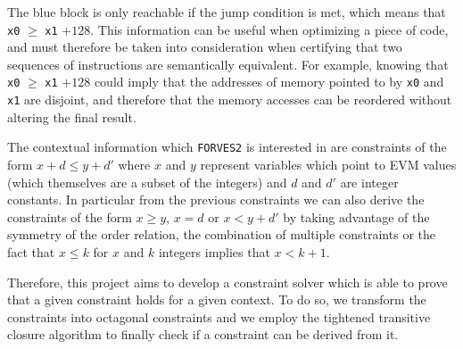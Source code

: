 \begin{center}
\end{center}

The blue block is only reachable if the jump condition is met, which means that \verb|x0| $\ge$ 
\verb|x1| $+ 128$. This information can be useful when optimizing a piece of code, and must therefore
be taken into consideration when certifying that two sequences of instructions are semantically 
equivalent. For example, knowing that \verb|x0| $\ge$ \verb|x1| $+ 128$ could imply that the addresses
of memory pointed to by \verb|x0| and \verb|x1| are disjoint, and therefore that the memory accesses
can be reordered without altering the final result.

The contextual information which \verb|FORVES2| is interested in are constraints of the form 
$x + d \le y + d'$ where $x$ and $y$ represent variables which point to EVM values (which themselves
are a subset of the integers) and $d$ and $d'$ are integer constants. In particular from the previous
constraints we can also derive the constraints of the form $x \ge y$, $x = d$ or $x < y + d'$ by taking
advantage of the symmetry of the order relation, the combination of multiple constraints or the fact
that $x \le k$ for $x$ and $k$ integers implies that $x < k + 1$. 

Therefore, this project aims to develop a constraint solver which is able to prove that a given
constraint holds for a given context. To do so, we transform the constraints into octagonal constraints
and we employ the tightened transitive closure algorithm to finally check if a constraint can be derived
from it.

